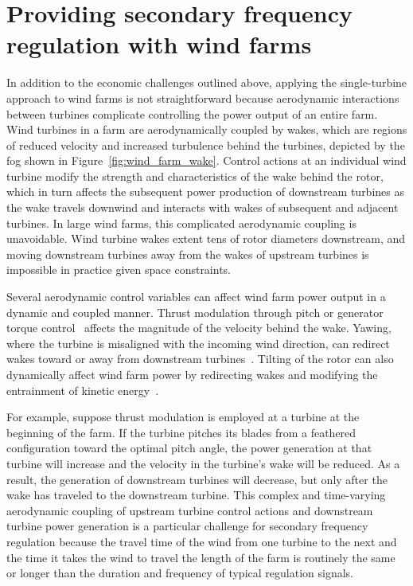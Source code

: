 \section{Providing secondary frequency regulation with wind farms}
\label{sec:intro-secondary-wind}
In addition to the economic challenges outlined above, applying the single-turbine approach to wind farms is not straightforward because aerodynamic interactions between turbines complicate controlling the power output of an entire farm. Wind turbines in a farm are aerodynamically coupled by wakes, which are regions of reduced velocity and increased turbulence behind the turbines, depicted by the fog shown in Figure~\ref{fig:wind_farm_wake}. Control actions at an individual wind turbine modify the strength and characteristics of the wake behind the rotor, which in turn affects the subsequent power production of downstream turbines as the wake travels downwind and interacts with wakes of subsequent and adjacent turbines. In large wind farms, this complicated aerodynamic coupling is unavoidable. Wind turbine wakes extent tens of rotor diameters downstream, and moving downstream turbines away from the wakes of upstream turbines is impossible in practice given space constraints.

Several aerodynamic control variables can affect wind farm power output in a dynamic and coupled manner. Thrust modulation through pitch or generator torque control~\cite{Annoni2015b} affects the magnitude of the velocity behind the wake. Yawing, where the turbine is misaligned with the incoming wind direction, can redirect wakes toward or away from downstream turbines~\cite{Fleming2014a, Fleming2015a}. Tilting of the rotor can also dynamically affect wind farm power by redirecting wakes and modifying the entrainment of kinetic energy~\cite{Fleming2014a, Verhulst2015a, Annoni2017a}.

For example, suppose thrust modulation is employed at a turbine at the beginning of the farm. If the turbine pitches its blades from a feathered configuration toward the optimal pitch angle, the power generation at that turbine will increase and the velocity in the turbine's wake will be reduced. As a result, the generation of downstream turbines will decrease, but only after the wake has traveled to the downstream turbine. This complex and time-varying aerodynamic coupling of upstream turbine control actions and downstream turbine power generation is a particular challenge for secondary frequency regulation because the travel time of the wind from one turbine to the next and the time it takes the wind to travel the length of the farm is routinely the same or longer than the duration and frequency of typical regulation signals.

